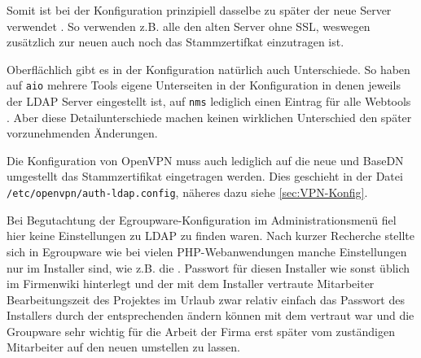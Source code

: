 \documentclass[11pt,a4paper,titlepage=firstiscover]{scrartcl} %
\begin{document}
Somit ist bei der Konfiguration  prinzipiell 
dasselbe zu  später der neue Server verwendet 
. So verwenden z.B. alle den alten Server ohne SSL, 
weswegen zusätzlich zur neuen  auch noch das Stammzertifkat 
einzutragen ist.  

Oberflächlich gibt es in der Konfiguration natürlich auch Unterschiede. So 
haben auf \texttt{aio} mehrere Tools eigene Unterseiten  in der Konfiguration in denen jeweils der LDAP Server eingestellt 
ist,  auf \texttt{nms}  lediglich 
einen Eintrag für alle Webtools . Aber diese Detailunterschiede 
machen keinen wirklichen Unterschied  den später vorzunehmenden 
Änderungen.

Die Konfiguration von OpenVPN muss auch lediglich auf die neue  
und BaseDN umgestellt  
das Stammzertifikat eingetragen werden. Dies geschieht in der Datei 
\texttt{/etc/openvpn/auth-ldap.config}, näheres dazu siehe \autoref{sec:VPN-Konfig}.

Bei Begutachtung der Egroupware-Konfiguration im Administrationsmenü fiel 
  hier keine Einstellungen zu LDAP zu finden waren. Nach 
kurzer Recherche stellte sich  in Egroupware \tcr{-} 
wie bei vielen PHP-Webanwendungen \tcr{-} manche Einstellungen nur im Installer 
 sind, wie  z.B. die 
.  Passwort für diesen Installer 
 \tcr{-} wie sonst üblich \tcr{-} im Firmenwiki 
hinterlegt und der mit dem Installer vertraute Mitarbeiter  Bearbeitungszeit des Projektes im Urlaub  
 zwar relativ einfach das Passwort des Installers durch 
 der entsprechenden  ändern können
  
mit dem  vertraut war und die Groupware sehr wichtig 
für die Arbeit der Firma   erst später 
vom zuständigen Mitarbeiter auf den neuen  umstellen zu lassen.
\end{document}
